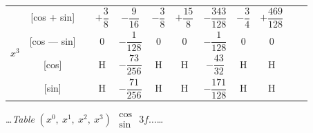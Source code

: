 \documentclass[10pt,a4paper]{article}
\newcommand{\tabletitle}[2]{%
  \begin{center}
  \ldots\textit{Table} #1 $\displaystyle\begin{smallmatrix} \cos \\ \sin \end{smallmatrix}$ #2\ldots
  \end{center}
}
\begin{document}
\begin{center}
\begin{tabular}{|c|c|c|c|c|c|c|c|c|c|c|c|}
\hline
\multirow{4}{*}{$x^3$} & [cos + sin] & & $+\dfrac{3}{8}$ & $-\dfrac{9}{16}$ & $-\dfrac{3}{8}$ & $+\dfrac{15}{8}$ & $-\dfrac{343}{128}$ & $-\dfrac{3}{4}$ & $+\dfrac{469}{128}$ \\
& [cos --- sin] & & $0$ & $-\dfrac{1}{128}$ & $0$ & $0$ & $-\dfrac{1}{128}$ & $0$ & $0$ \\
& [cos] & & H & $-\dfrac{73}{256}$ & H & H & $-\dfrac{43}{32}$ & H & H \\
& [sin] & & H & $-\dfrac{71}{256}$ & H & H & $-\dfrac{171}{128}$ & H & H \\
\hline
\end{tabular}
\end{center}

\vspace{1em}

\tabletitle{$(x^0,\ x^1,\ x^2,\ x^3)$}{$3f\ldots$}
\end{document}
